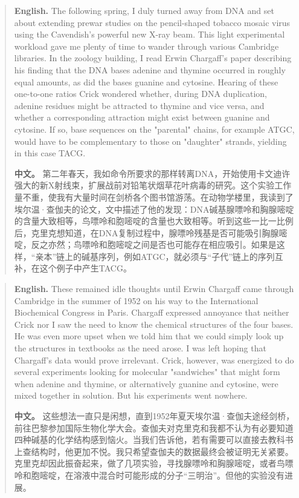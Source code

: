 \begin{quote}
\noindent\textbf{English.} The following spring, I duly turned away from DNA and set about extending prewar studies on the pencil-shaped tobacco mosaic virus using the Cavendish's powerful new X-ray beam. This light experimental workload gave me plenty of time to wander through various Cambridge libraries. In the zoology building, I read Erwin Chargaff's paper describing his finding that the DNA bases adenine and thymine occurred in roughly equal amounts, as did the bases guanine and cytosine. Hearing of these one-to-one ratios Crick wondered whether, during DNA duplication, adenine residues might be attracted to thymine and vice versa, and whether a corresponding attraction might exist between guanine and cytosine. If so, base sequences on the "parental" chains, for example ATGC, would have to be complementary to those on "daughter" strands, yielding in this case TACG.

\smallskip
\noindent\textbf{中文。} 第二年春天，我如命令所要求的那样转离DNA，开始使用卡文迪许强大的新X射线束，扩展战前对铅笔状烟草花叶病毒的研究。这个实验工作量不重，使我有大量时间在剑桥各个图书馆游荡。在动物学楼里，我读到了埃尔温·查伽夫的论文，文中描述了他的发现：DNA碱基腺嘌呤和胸腺嘧啶的含量大致相等，鸟嘌呤和胞嘧啶的含量也大致相等。听到这些一比一比例后，克里克想知道，在DNA复制过程中，腺嘌呤残基是否可能吸引胸腺嘧啶，反之亦然；鸟嘌呤和胞嘧啶之间是否也可能存在相应吸引。如果是这样，“亲本”链上的碱基序列，例如ATGC，就必须与“子代”链上的序列互补，在这个例子中产生TACG。
\end{quote}

\begin{quote}
\noindent\textbf{English.} These remained idle thoughts until Erwin Chargaff came through Cambridge in the summer of 1952 on his way to the International Biochemical Congress in Paris. Chargaff expressed annoyance that neither Crick nor I saw the need to know the chemical structures of the four bases. He was even more upset when we told him that we could simply look up the structures in textbooks as the need arose. I was left hoping that Chargaff's data would prove irrelevant. Crick, however, was energized to do several experiments looking for molecular "sandwiches" that might form when adenine and thymine, or alternatively guanine and cytosine, were mixed together in solution. But his experiments went nowhere.

\smallskip
\noindent\textbf{中文。} 这些想法一直只是闲想，直到1952年夏天埃尔温·查伽夫途经剑桥，前往巴黎参加国际生物化学大会。查伽夫对克里克和我都不认为有必要知道四种碱基的化学结构感到恼火。当我们告诉他，若有需要可以直接去教科书上查结构时，他更加不悦。我只希望查伽夫的数据最终会被证明无关紧要。克里克却因此振奋起来，做了几项实验，寻找腺嘌呤和胸腺嘧啶，或者鸟嘌呤和胞嘧啶，在溶液中混合时可能形成的分子“三明治”。但他的实验没有进展。
\end{quote}

